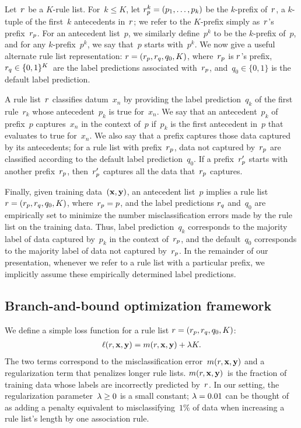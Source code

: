 Let~${r}$ be a $K$-rule list.
%
For~$k \le K$, let ${{r}_p^k = (p_1, \dots, p_k)}$ be the $k$-prefix of~${r}$,
a $k$-tuple of the first~$k$ antecedents in~${r}$;
we refer to the $K$-prefix simply as~${r}$'s prefix~${r_p}$.
%
For an antecedent list~$p$, we similarly define~$p^k$ to be the $k$-prefix of~$p$,
and for any $k$-prefix~$p^k$, we say that~$p$ starts with~$p^k$.
%
We now give a useful alternate rule list representation:
${{r} = ({r_p}, {r}_q, q_0, K)}$, where~${r_p}$ is ${r}$'s prefix,
${{r}_q \in \{0, 1\}^K}$~are the label predictions associated with~${r_p}$,
and~${q_0 \in \{0, 1\}}$ is the default label prediction.

A rule list~${r}$ classifies datum~$x_n$ by providing the label prediction~$q_k$
of the first rule~$r_k$ whose antecedent~$p_k$ is true for~$x_n$.
%
We say that an antecedent~$p_k$ of prefix~$p$ captures~$x_n$ in the context of~$p$
if~$p_k$ is the first antecedent in~$p$ that evaluates to true for~$x_n$.
%
We also say that a prefix captures those data captured by its antecedents;
for a rule list with prefix~${r_p}$, data not captured by~${r_p}$
are classified according to the default label prediction~$q_0$.
%
If a prefix~${r'_p}$ starts with another prefix~${r_p}$,
then~${r'_p}$ captures all the data that~${r_p}$ captures.

Finally, given training data~${(\mathbf{x}, \mathbf{y})}$, an antecedent list~$p$
implies a rule list ${{r} = ({r_p}, {r}_q, q_0, K)}$,
where~${{r_p} = p}$, and the label predictions ${r}_q$  and~$q_0$ are
empirically set to minimize the number misclassification errors made
by the rule list on the training data.
%
Thus, label prediction~$q_k$ corresponds to the majority label of data captured
by~$p_k$ in the context of~${r_p}$, and the default~$q_0$ corresponds to
the majority label of data not captured by~${r_p}$.
%
In the remainder of our presentation, whenever we refer to a rule list with a
particular prefix, we implicitly assume these empirically determined label predictions.

\subsection{Branch-and-bound optimization framework}

We define a simple loss function for a rule list ${{r} = ({r_p}, {r}_q, q_0, K)}$:
\begin{align}
\ell(\RL, \x, \y) = m(\RL, \x, \y) + \Reg K.
\label{eq:objective}
\end{align}
The two terms correspond to the misclassification error~$m({r}, \mathbf{x}, \mathbf{y})$
and a regularization term that penalizes longer rule lists.
%
$m({r}, \mathbf{x}, \mathbf{y})$~is the fraction of training data whose labels are
incorrectly predicted by~${r}$.
%
In our setting, the regularization parameter~${{\lambda} \ge 0}$ is a small constant;
\eg ${{\lambda} = 0.01}$ can be thought of as adding a penalty equivalent to misclassifying~$1\%$
of data when increasing a rule list's length by one association rule.
%

